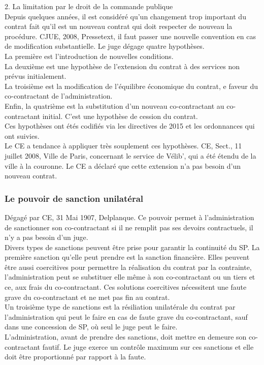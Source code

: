\documentclass[10pt, a4paper, openany]{book}
\begin{document}
2. La limitation par le droit de la commande publique \\
Depuis quelques années, il est considéré qu'un changement trop important du contrat fait qu'il est un nouveau contrat qui doit respecter de nouveau la procédure. CJUE, 2008, Pressetext, il faut passer une nouvelle convention en cas de modification substantielle. Le juge dégage quatre hypothèses. \\
La première est l'introduction de nouvelles conditions. \\
La deuxième est une hypothèse de l'extension du contrat à des services non prévus initialement. \\
La troisième est la modification de l'équilibre économique du contrat, e faveur du co-contractant de l'administration. \\
Enfin, la quatrième est la substitution d'un nouveau co-contractant au co-contractant initial. C'est une hypothèse de cession du contrat. \\
Ces hypothèses ont étés codifiés via les directives de 2015 et les ordonnances qui ont suivies. \\
Le CE a tendance à appliquer très souplement ces hypothèses. CE, Sect., 11 juillet 2008, Ville de Paris, concernant le service de Vélib', qui a été étendu de la ville à la couronne. Le CE a déclaré que cette extension n'a pas besoin d'un nouveau contrat. 

\subsubsection{Le pouvoir de sanction unilatéral}

Dégagé par CE, 31 Mai 1907, Delplanque. Ce pouvoir permet à l'administration de sanctionner son co-contractant si il ne remplit pas ses devoirs contractuels, il n'y a pas besoin d'un juge. \\
Divers types de sanctions peuvent être prise pour garantir la continuité du SP. La première sanction qu'elle peut prendre est la sanction financière. Elles peuvent être aussi coercitives pour permettre la réalisation du contrat par la contrainte, l'administration peut se substituer elle même à son co-contractant ou un tiers et ce, aux frais du co-contractant. Ces solutions coercitives nécessitent une faute grave du co-contractant et ne met pas fin au contrat. \\
Un troisième type de sanctions est la résiliation unilatérale du contrat par l'administration qui peut le faire en cas de faute grave du co-contractant, sauf dans une concession de SP, où seul le juge peut le faire. \\
L'administration, avant de prendre des sanctions, doit mettre en demeure son co-contractant fautif. Le juge exerce un contrôle maximum sur ces sanctions et elle doit être proportionné par rapport à la faute. 
\end{document}
